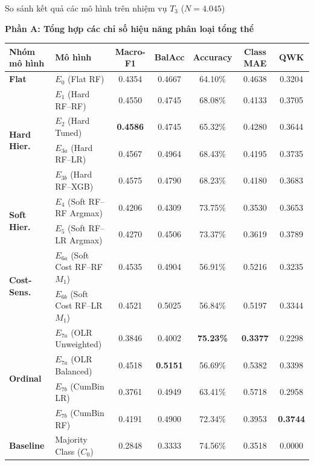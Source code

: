 \begin{table}{So sánh kết quả các mô hình trên nhiệm vụ $T_3$ ($N = 4.045$)}
\centering
\footnotesize
\setlength{\tabcolsep}{4pt}
\label{tab:master-comparison}

\vspace{-0.1cm}
\textbf{Phần A: Tổng hợp các chỉ số hiệu năng phân loại tổng thể}
\vspace{0.15cm}

\begin{tabularx}{\textwidth}{l X c c c c c}
\toprule
\textbf{Nhóm mô hình} & \textbf{Mô hình} & \textbf{Macro-F1} & \textbf{BalAcc} & \textbf{Accuracy} & \textbf{Class MAE} & \textbf{QWK} \\
\midrule
\textbf{Flat} & $E_0$ (Flat RF) & 0.4354 & 0.4667 & 64.10\% & 0.4638 & 0.3204 \\
\midrule
\multirow{4}{*}{\textbf{Hard Hier.}} 
  & $E_1$ (Hard RF--RF)   & 0.4550 & 0.4745 & 68.08\% & 0.4133 & 0.3705 \\
  & $E_2$ (Hard Tuned)    & \textbf{0.4586} & 0.4745 & 65.32\% & 0.4280 & 0.3644 \\
  & $E_{3a}$ (Hard RF--LR) & 0.4567 & 0.4964 & 68.43\% & 0.4195 & 0.3735 \\
  & $E_{3b}$ (Hard RF--XGB)& 0.4575 & 0.4790 & 68.23\% & 0.4180 & 0.3683 \\
\midrule
\multirow{2}{*}{\textbf{Soft Hier.}} 
  & $E_4$ (Soft RF--RF Argmax) & 0.4206 & 0.4309 & 73.75\% & 0.3530 & 0.3653 \\
  & $E_5$ (Soft RF--LR Argmax) & 0.4270 & 0.4506 & 73.37\% & 0.3619 & 0.3789 \\
\midrule
\multirow{2}{*}{\textbf{Cost-Sens.}}
  & $E_{6a}$ (Soft Cost RF--RF $M_1$) & 0.4535 & 0.4904 & 56.91\% & 0.5216 & 0.3235 \\
  & $E_{6b}$ (Soft Cost RF--LR $M_1$) & 0.4521 & 0.5025 & 56.84\% & 0.5197 & 0.3344 \\
\midrule
\multirow{4}{*}{\textbf{Ordinal}} 
  & $E_{7a}$ (OLR Unweighted) & 0.3846 & 0.4002 & \textbf{75.23\%} & \textbf{0.3377} & 0.2298 \\
  & $E_{7a}$ (OLR Balanced)   & 0.4518 & \textbf{0.5151} & 56.69\% & 0.5382 & 0.3398 \\
  & $E_{7b}$ (CumBin LR)      & 0.3761 & 0.4949 & 63.41\% & 0.5718 & 0.2958 \\
  & $E_{7b}$ (CumBin RF)      & 0.4191 & 0.4900 & 72.34\% & 0.3953 & \textbf{0.3744} \\
\midrule
\textbf{Baseline} & Majority Class ($C_0$) & 0.2848 & 0.3333 & 74.56\% & 0.3518 & 0.0000 \\
\bottomrule
\end{tabularx}


\end{table}
